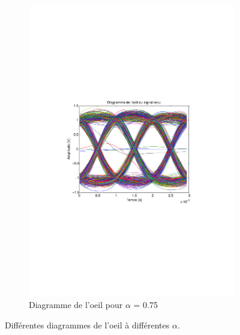 \documentclass[a4paper,11pt]{article}
\begin{document}
\begin{figure}
\begin{subfigure}{.5\textwidth}
  		\includegraphics[width=1\linewidth]{Q10-alfa075.pdf}
  		\caption{Diagramme de l'oeil pour $\alpha$ = 0.75}
  		\label{fig:q10a075}
	\end{subfigure}
	\caption{Différentes diagrammes de l'oeil à différentes $\alpha$.}
	\label{fig:q10a}
\end{figure} 
\end{document}
